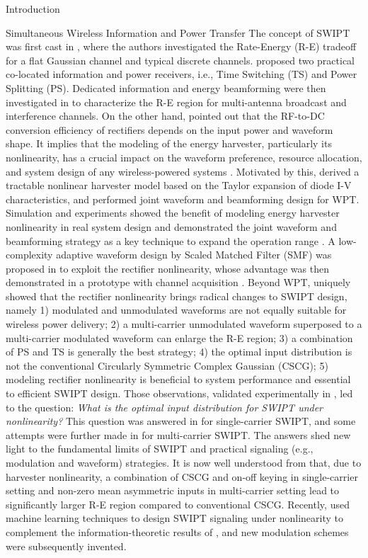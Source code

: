 \documentclass[journal]{IEEEtran}
\begin{document}
\begin{section}{Introduction}
\begin{subsection}{Simultaneous Wireless Information and Power Transfer}
            The concept of SWIPT was first cast in \cite{Varshney2008}, where the authors investigated the Rate-Energy (R-E) tradeoff for a flat Gaussian channel and typical discrete channels. \cite{Zhou2013} proposed two practical co-located information and power receivers, i.e., Time Switching (TS) and Power Splitting (PS). Dedicated information and energy beamforming were then investigated in \cite{Zhang2013,Park2014} to characterize the R-E region for multi-antenna broadcast and interference channels. On the other hand, \cite{Trotter2009} pointed out that the RF-to-DC conversion efficiency of rectifiers depends on the input power and waveform shape. It implies that the modeling of the energy harvester, particularly its nonlinearity, has a crucial impact on the waveform preference, resource allocation, and system design of any wireless-powered systems \cite{Trotter2009,Clerckx2018,Clerckx2019}. Motivated by this, \cite{Clerckx2016a} derived a tractable nonlinear harvester model based on the Taylor expansion of diode I-V characteristics, and performed joint waveform and beamforming design for WPT. Simulation and experiments showed the benefit of modeling energy harvester nonlinearity in real system design \cite{Kim2019,Kim2020a} and demonstrated the joint waveform and beamforming strategy as a key technique to expand the operation range \cite{Kim2021}. A low-complexity adaptive waveform design by Scaled Matched Filter (SMF) was proposed in \cite{Clerckx2017} to exploit the rectifier nonlinearity, whose advantage was then demonstrated in a prototype with channel acquisition \cite{Kim2017}. Beyond WPT, \cite{Clerckx2018b} uniquely showed that the rectifier nonlinearity brings radical changes to SWIPT design, namely 1) modulated and unmodulated waveforms are not equally suitable for wireless power delivery; 2) a multi-carrier unmodulated waveform superposed to a multi-carrier modulated waveform can enlarge the R-E region; 3) a combination of PS and TS is generally the best strategy; 4) the optimal input distribution is not the conventional Circularly Symmetric Complex Gaussian (CSCG); 5) modeling rectifier nonlinearity is beneficial to system performance and essential to efficient SWIPT design. Those observations, validated experimentally in \cite{Kim2019}, led to the question: \emph{What is the optimal input distribution for SWIPT under nonlinearity?} This question was answered in \cite{Varasteh2020} for single-carrier SWIPT, and some attempts were further made in \cite{Varasteh2019d} for multi-carrier SWIPT. The answers shed new light to the fundamental limits of SWIPT and practical signaling (e.g., modulation and waveform) strategies. It is now well understood from \cite{Clerckx2018b,Varasteh2020,Varasteh2019d} that, due to harvester nonlinearity, a combination of CSCG and on-off keying in single-carrier setting and non-zero mean asymmetric inputs in multi-carrier setting lead to significantly larger R-E region compared to conventional CSCG. Recently, \cite{Varasteh2020a} used machine learning techniques to design SWIPT signaling under nonlinearity to complement the information-theoretic results of \cite{Varasteh2020}, and new modulation schemes were subsequently invented.

\end{subsection}
\end{section}
\end{document}
